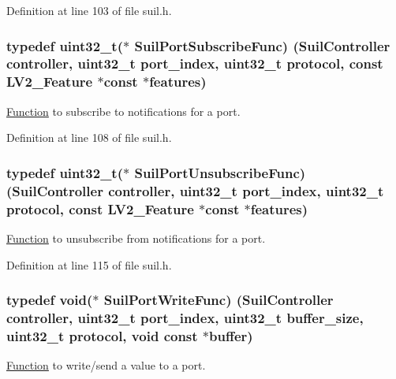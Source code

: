 Definition at line 103 of file suil.\+h.

\subsubsection[{\texorpdfstring{Suil\+Port\+Subscribe\+Func}{SuilPortSubscribeFunc}}]{\setlength{\rightskip}{0pt plus 5cm}typedef {\bf uint32\+\_\+t}($\ast$ Suil\+Port\+Subscribe\+Func) ({\bf Suil\+Controller} controller, {\bf uint32\+\_\+t} port\+\_\+index, {\bf uint32\+\_\+t} protocol, {\bf const} {\bf L\+V2\+\_\+\+Feature} $\ast${\bf const} $\ast$features)}\hypertarget{group__suil_gab178a917cd59601d1c54121638dc8a3a}{}\label{group__suil_gab178a917cd59601d1c54121638dc8a3a}
\hyperlink{class_function}{Function} to subscribe to notifications for a port. 

Definition at line 108 of file suil.\+h.

\subsubsection[{\texorpdfstring{Suil\+Port\+Unsubscribe\+Func}{SuilPortUnsubscribeFunc}}]{\setlength{\rightskip}{0pt plus 5cm}typedef {\bf uint32\+\_\+t}($\ast$ Suil\+Port\+Unsubscribe\+Func) ({\bf Suil\+Controller} controller, {\bf uint32\+\_\+t} port\+\_\+index, {\bf uint32\+\_\+t} protocol, {\bf const} {\bf L\+V2\+\_\+\+Feature} $\ast${\bf const} $\ast$features)}\hypertarget{group__suil_gaa38ef1f02fde6358c58b5c533b916797}{}\label{group__suil_gaa38ef1f02fde6358c58b5c533b916797}
\hyperlink{class_function}{Function} to unsubscribe from notifications for a port. 

Definition at line 115 of file suil.\+h.

\subsubsection[{\texorpdfstring{Suil\+Port\+Write\+Func}{SuilPortWriteFunc}}]{\setlength{\rightskip}{0pt plus 5cm}typedef {\bf void}($\ast$ Suil\+Port\+Write\+Func) ({\bf Suil\+Controller} controller, {\bf uint32\+\_\+t} port\+\_\+index, {\bf uint32\+\_\+t} buffer\+\_\+size, {\bf uint32\+\_\+t} protocol, {\bf void} {\bf const} $\ast${\bf buffer})}\hypertarget{group__suil_ga2da768960d0b91c1515288387f4e5582}{}\label{group__suil_ga2da768960d0b91c1515288387f4e5582}
\hyperlink{class_function}{Function} to write/send a value to a port. 


